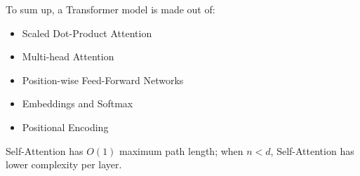 To sum up, a Transformer model is made out of:
\begin{itemize}
    \item Scaled Dot-Product Attention
    \item Multi-head Attention
    \item Position-wise Feed-Forward Networks
    \item Embeddings and Softmax
    \item Positional Encoding
\end{itemize}{}
Self-Attention has $O(1)$ maximum path length; when $n < d$, Self-Attention has lower complexity per layer.


